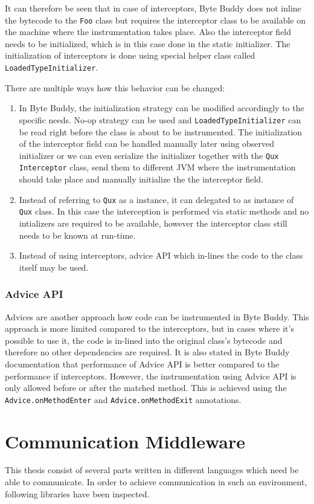 It can therefore be seen that in case of interceptors, Byte Buddy does not inline the bytecode to the \texttt{Foo} class but requires the interceptor class to be available on the machine where the instrumentation takes place. Also the interceptor field needs to be initialized, which is in this case done in the static initializer. The initialization of interceptors is done using special helper class called \texttt{LoadedTypeInitializer}.

There are multiple ways how this behavior can be changed:
\begin{enumerate}
\item In Byte Buddy, the initialization strategy can be modified accordingly to the specific needs. No-op strategy can be used and \texttt{LoadedTypeInitializer} can be read right before the class is about to be instrumented.  The initialization of the interceptor field can be handled manually later using observed initializer or we can even serialize the initializer together with the \texttt{Qux} \texttt{Interceptor} class, send them to different JVM where the instrumentation should take place and manually initialize the the interceptor field.
\item Instead of referring to \texttt{Qux} as a instance, it can delegated to as instance of \texttt{Qux} class. In this case the interception is performed via static methods and no intializers are required to be available, however the interceptor class still needs to be known at run-time.
\item Instead of using interceptors, advice API which in-lines the code to the class itself may be used.
\end{enumerate}
\subsubsection{Advice API}
Advices are another approach how code can be instrumented in Byte Buddy. This approach is more limited compared to the interceptors, but in cases where it's possible to use it, the code is in-lined into the original class's bytecode and therefore no other dependencies are required. It is also stated in Byte Buddy documentation that performance of Advice API is better compared to the performance if interceptors.
However, the instrumentation using Advice API is only allowed before or after the matched method. This is achieved using the \texttt{Advice.onMethodEnter} and \texttt{Advice.onMethodExit} annotations.

\section{Communication Middleware}
This thesis consist of several parts written in different languages which need be able to communicate. In order to achieve communication in such an environment, following libraries have been inspected.
